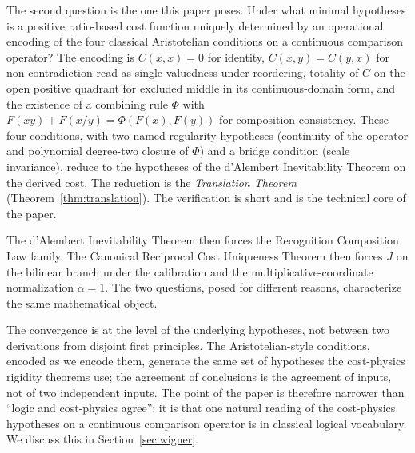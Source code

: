 \documentclass[11pt,a4paper]{article}
\theoremstyle{definition}
\theoremstyle{remark}
\begin{document}
The second question is the one this paper poses. Under what minimal
hypotheses is a positive ratio-based cost function uniquely determined
by an operational encoding of the four classical Aristotelian
conditions on a continuous comparison operator? The encoding is
$C(x, x) = 0$ for identity, $C(x, y) = C(y, x)$ for non-contradiction
read as single-valuedness under reordering, totality of $C$ on the
open positive quadrant for excluded middle in its continuous-domain
form, and the existence of a combining rule $\Phi$ with
$F(xy) + F(x/y) = \Phi(F(x), F(y))$ for composition consistency. These
four conditions, with two named regularity hypotheses (continuity of
the operator and polynomial degree-two closure of $\Phi$) and a bridge
condition (scale invariance), reduce to the hypotheses of the
d'Alembert Inevitability Theorem on the derived cost. The reduction is
the \emph{Translation Theorem} (Theorem~\ref{thm:translation}). The
verification is short and is the technical core of the paper.

The d'Alembert Inevitability Theorem then forces the Recognition
Composition Law family. The Canonical Reciprocal Cost Uniqueness
Theorem then forces $J$ on the bilinear branch under the calibration
and the multiplicative-coordinate normalization $\alpha = 1$. The two
questions, posed for different reasons, characterize the same
mathematical object.

The convergence is at the level of the underlying hypotheses, not
between two derivations from disjoint first principles. The
Aristotelian-style conditions, encoded as we encode them, generate the
same set of hypotheses the cost-physics rigidity theorems use; the
agreement of conclusions is the agreement of inputs, not of two
independent inputs. The point of the paper is therefore narrower than
``logic and cost-physics agree'': it is that one natural reading of
the cost-physics hypotheses on a continuous comparison operator is in
classical logical vocabulary. We discuss this in
Section~\ref{sec:wigner}.
\end{document}
